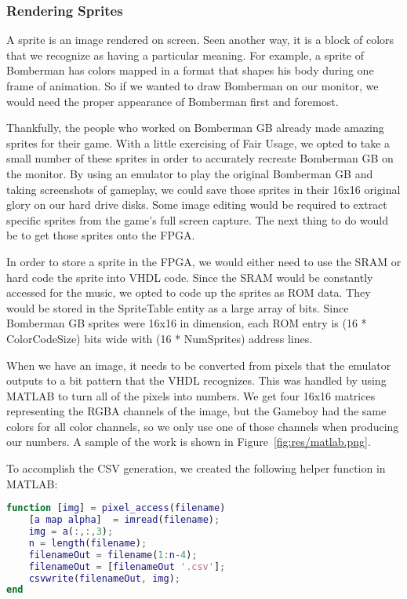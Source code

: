 \documentclass[10pt,a4paper]{article}
\begin{document}
\subsubsection{Rendering Sprites}
A sprite is an image rendered on screen. Seen another way, it is a block of colors that we recognize as having a particular meaning. For example, a sprite of Bomberman has colors mapped in a format that shapes his body during one frame of animation. So if we wanted to draw Bomberman on our monitor, we would need the proper appearance of Bomberman first and foremost.

Thankfully, the people who worked on Bomberman GB already made amazing sprites for their game. With a little exercising of Fair Usage, we opted to take a small number of these sprites in order to accurately recreate Bomberman GB on the monitor. By using an emulator to play the original Bomberman GB and taking screenshots of gameplay, we could save those sprites in their 16x16 original glory on our hard drive disks. Some image editing would be required to extract specific sprites from the game's full screen capture. The next thing to do would be to get those sprites onto the FPGA.

In order to store a sprite in the FPGA, we would either need to use the SRAM or hard code the sprite into VHDL code. Since the SRAM would be constantly accessed for the music, we opted to code up the sprites as ROM data. They would be stored in the SpriteTable entity as a large array of bits. Since Bomberman GB sprites were 16x16 in dimension, each ROM entry is (16 * ColorCodeSize) bits wide with (16 * NumSprites) address lines.

When we have an image, it needs to be converted from pixels that the emulator outputs to a bit pattern that the VHDL recognizes. This was handled by using MATLAB to turn all of the pixels into numbers. We get four 16x16 matrices representing the RGBA channels of the image, but the Gameboy had the same colors for all color channels, so we only use one of those channels when producing our numbers. A sample of the work is shown in Figure~\ref{fig:res/matlab.png}.

To accomplish the CSV generation, we created the following helper function in MATLAB:

\begin{center}
\begin{lstlisting}[language=matlab]
function [img] = pixel_access(filename)
	[a map alpha]  = imread(filename);
	img = a(:,:,3);
	n = length(filename);
	filenameOut = filename(1:n-4);
	filenameOut = [filenameOut '.csv'];
	csvwrite(filenameOut, img);
end
\end{lstlisting}
\end{center}
\end{document}
